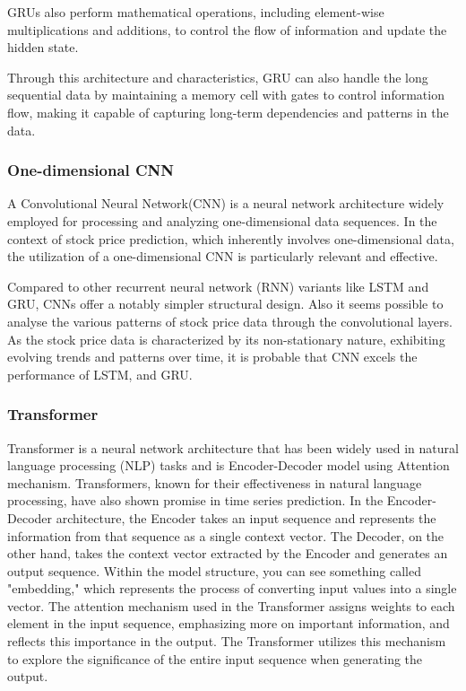 GRUs also perform mathematical operations, including element-wise multiplications and additions, to control the flow of information and update the hidden state.

Through this architecture and characteristics, GRU can also handle the long sequential data by maintaining a memory cell with gates to control information flow, 
making it capable of capturing long-term dependencies and patterns in the data.


\subsubsection{One-dimensional CNN}

A Convolutional Neural Network(CNN) is a neural network architecture widely employed for processing and analyzing one-dimensional data sequences. 
In the context of stock price prediction, which inherently involves one-dimensional data, the utilization of a one-dimensional CNN is particularly relevant and effective.

Compared to other recurrent neural network (RNN) variants like LSTM and GRU, CNNs offer a notably simpler structural design. 
Also it seems possible to analyse the various patterns of stock price data through the convolutional layers.
As the stock price data is characterized by its non-stationary nature, exhibiting evolving trends and patterns over time, 
it is probable that CNN excels the performance of LSTM, and GRU.

\subsubsection{Transformer}

Transformer is a neural network architecture that has been widely used in natural language processing (NLP) tasks and is Encoder-Decoder model using Attention mechanism.
Transformers, known for their effectiveness in natural language processing, have also shown promise in time series prediction. 
In the Encoder-Decoder architecture, the Encoder takes an input sequence and represents the information from that sequence as a single context vector. 
The Decoder, on the other hand, takes the context vector extracted by the Encoder and generates an output sequence. 
Within the model structure, you can see something called "embedding," which represents the process of converting input values into a single vector.
The attention mechanism used in the Transformer assigns weights to each element in the input sequence, emphasizing more on important information, 
and reflects this importance in the output. The Transformer utilizes this mechanism to explore the significance of the entire input sequence when generating the output.

